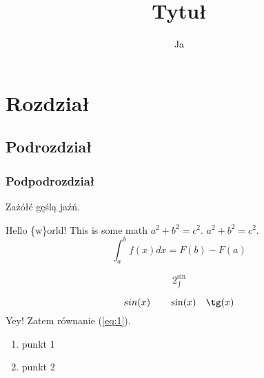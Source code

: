 \documentclass{article}
\title{Tytuł}
\author{Ja}
\begin{document}
\maketitle

\tableofcontents

\section{Rozdział}

\subsection{Podrozdział}

\subsubsection{Podpodrozdział}


Zażółć gęślą jaźń.

Hello \{w\}orld!
This is some math $a^2 + b^2 = c^2$.
$a^2+b^2=c^2$.
\begin{equation}
    \int_a^b f(x) dx = F(b)-F(a)
    \label{eq:1}
\end{equation}

\begin{equation}
    2_{\int}^{\sin}
\end{equation}

\begin{equation*}
    s i n(x)\qquad \sin(x)\quad \tg(x)
\end{equation*}
Yey! Zatem równanie (\ref{eq:1}).

\begin{enumerate}
    \item punkt 1
    \item punkt 2
\end{enumerate}
\end{document}
